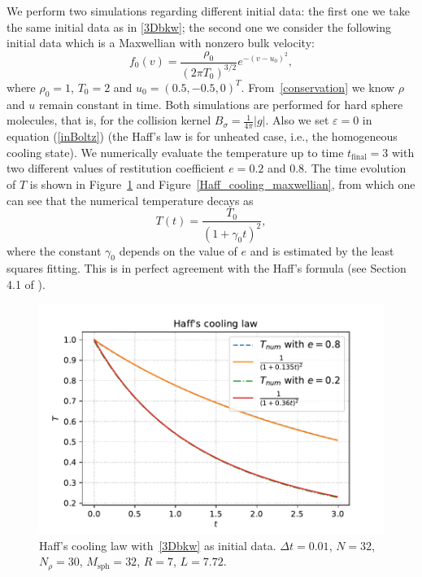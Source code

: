 \documentclass[review,times]{elsarticle}
\begin{document}
{\color{red} We perform two simulations regarding different initial data: the first one we take the same initial data as in \eqref{3Dbkw}; the second one we consider the following initial data which is a Maxwellian with nonzero bulk velocity:
\begin{equation}\label{3D_maxwellian}
  f_0(v) = \frac{\rho_0}{(2\pi T_0)^{3/2}}e^{-(v - u_0)^2},
\end{equation}
where $\rho_0 = 1$, $T_0 = 2$ and $u_0 = (0.5, -0.5, 0)^T$. From~\eqref{conservation} we know $\rho$ and $u$ remain constant in time. Both simulations are performed} for hard sphere molecules, that is, for the collision kernel $B_{\sigma} = \frac{1}{4\pi}|g|$. Also we set $\varepsilon=0$ in equation (\ref{inBoltz}) (the Haff's law is for unheated case, i.e., the homogeneous cooling state). We numerically evaluate the temperature up to time $t_\text{final}=3$ with two different values of restitution coefficient $e=0.2$ and $0.8$. The time evolution of $T$ is shown in Figure~\ref{Haff_cooling} and Figure~\ref{Haff_cooling_maxwellian}, from which one can see that the numerical temperature decays as 
\begin{equation}
T(t) = \frac{T_0}{(1+\gamma_0 t)^2},
\end{equation}
where the constant $\gamma_0$ {\color{red} depends on the value of $e$ and is estimated by the least squares fitting}. This is in perfect agreement with the Haff's formula (see Section 4.1 of \cite{NE}).

\begin{figure}[htp!]
  \centering
  \includegraphics[width = .8\linewidth]{Haff's_cooling}
  \caption{Haff's cooling law {\color{red} with~\eqref{3Dbkw} as initial data}. $\Delta t=0.01$, $N=32$, $N_{\rho}=30$, $M_{\text{sph}}=32$, $R=7$, $L=7.72$.}
  \label{Haff_cooling}
\end{figure}
\end{document}

